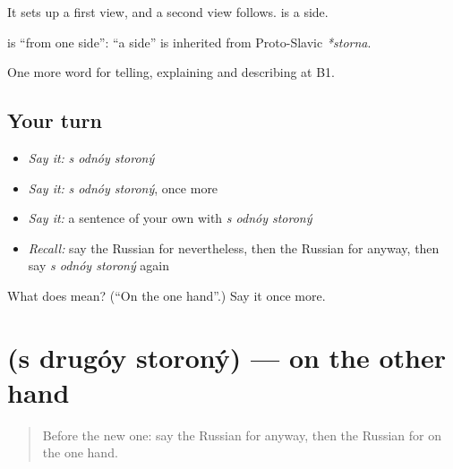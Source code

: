 It sets up a first view, and a second view follows. \emph{} is a side.

\begin{cousinweb}
\textbf{  } is \textquotedblleft{}from one side\textquotedblright{}: \emph{} \textquotedblleft{}a side\textquotedblright{} is inherited from Proto-Slavic \emph{*storna}.
\end{cousinweb}

\begin{grammarlens}[title={What you've built}]
One more word for telling, explaining and describing at B1.
\end{grammarlens}

\subsection*{Your turn}
\begin{itemize}
\raggedright
  \item \emph{Say it:} \emph{s odnóy storoný}
  \item \emph{Say it:} \emph{s odnóy storoný}, once more
  \item \emph{Say it:} a sentence of your own with \emph{s odnóy storoný}
  \item \emph{Recall:} say the Russian for nevertheless, then the Russian for anyway, then say \emph{s odnóy storoný} again
\end{itemize}

\begin{tcolorbox}[breakable,colback=teal!4,colframe=teal!35!black,title={Before you move on}]
What does    mean? (\textquotedblleft{}On the one hand\textquotedblright{}.) Say it once more.
\end{tcolorbox}
\section[\texorpdfstring{\ru{с} \ru{другой} \ru{стороны} (s drugóy storoný)}{с другой стороны (s drugóy storoný)}]{   (s drugóy storoný) — on the other hand}

\label{lesson:RU-C356-s-drugoy-storony}



\begin{quote}
Before the new one: say the Russian for anyway, then the Russian for on the one hand.
\end{quote}

